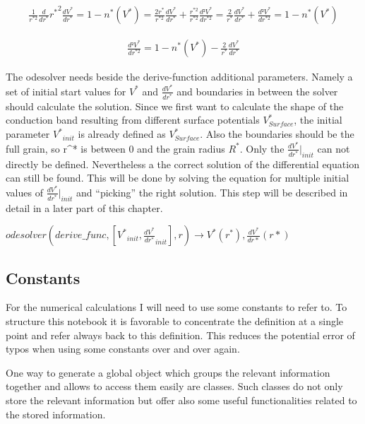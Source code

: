\documentclass[11pt]{article}
\begin{document}
\begin{align}
\frac{1}{r^{*2}}\frac{d}{dr^{*}}{r^{*}}^{2}\frac{dV^{*}}{dr^{*}}=1-n^{*}(V^{*})=\frac{2r^{*}}{r^{*2}}\frac{dV^{*}}{dr^{*}}+\frac{r^{*2}}{r^{*2}}\frac{d²V^{*}}{dr^{*2}}=\frac{2}{r^{*}}\frac{dV^{*}}{dr^{*}}+\frac{d²V^{*}}{dr^{*2}}=1-n^{*}(V^{*}) 
\end{align}

\begin{align}
\frac{d²V^{*}}{dr^{*2}}=1-n^{*}(V^{*})-\frac{2}{r^{*}}\frac{dV^{*}}{dr^{*}}\label{second_derivative}\tag{Second derivative}
\end{align}

The odesolver needs beside the derive-function additional parameters.
Namely a set of initial start values for \(V^{*}\) and
\(\frac{dV^{*}}{dr^{*}}\) and boundaries in between the solver should
calculate the solution. Since we first want to calculate the shape of
the conduction band resulting from different surface potentials
\(V^{*}_{Surface}\), the initial parameter \(V^{*}{}_{init}\) is already
defined as \(V^{*}_{Surface}\). Also the boundaries should be the full
grain, so r\^{}* is between 0 and the grain radius \(R^*\). Only the
\(\frac{dV^{*}}{dr^{*}}|_{init}\) can not directly be defined.
Nevertheless a the correct solution of the differential equation can
still be found. This will be done by solving the equation for multiple
initial values of \(\frac{dV^{*}}{dr^{*}}|_{init}\) and ``picking'' the
right solution. This step will be described in detail in a later part of
this chapter.

\(odesolver(derive\_func,[V^{*}{}_{init},\frac{dV^{*}}{dr^{*}}_{init}],r)\longrightarrow V^{*}(r^{*}),\frac{dV^{*}}{dr*}(r*)\)

    \hypertarget{constants}{%
\subsection{Constants}\label{constants}}

For the numerical calculations I will need to use some constants to
refer to. To structure this notebook it is favorable to concentrate the
definition at a single point and refer always back to this definition.
This reduces the potential error of typos when using some constants over
and over again.

One way to generate a global object which groups the relevant
information together and allows to access them easily are classes. Such
classes do not only store the relevant information but offer also some
useful functionalities related to the stored information.
\end{document}
